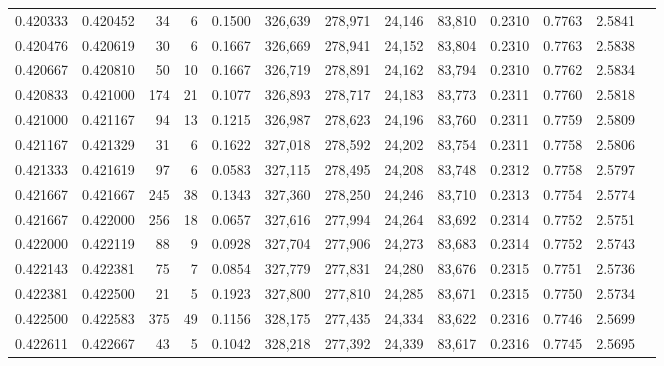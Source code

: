 \begin{tabular}{rrrrrrrrrrrrr}
0.420333 & 0.420452 &    34 &   6 &                                     0.1500 & 326,639 & 278,971 &  24,146 &  83,810 & 0.2310 & 0.7763 & 2.5841 \\
0.420476 & 0.420619 &    30 &   6 &                                     0.1667 & 326,669 & 278,941 &  24,152 &  83,804 & 0.2310 & 0.7763 & 2.5838 \\
0.420667 & 0.420810 &    50 &  10 &                                     0.1667 & 326,719 & 278,891 &  24,162 &  83,794 & 0.2310 & 0.7762 & 2.5834 \\
0.420833 & 0.421000 &   174 &  21 &                                     0.1077 & 326,893 & 278,717 &  24,183 &  83,773 & 0.2311 & 0.7760 & 2.5818 \\
0.421000 & 0.421167 &    94 &  13 &                                     0.1215 & 326,987 & 278,623 &  24,196 &  83,760 & 0.2311 & 0.7759 & 2.5809 \\
0.421167 & 0.421329 &    31 &   6 &                                     0.1622 & 327,018 & 278,592 &  24,202 &  83,754 & 0.2311 & 0.7758 & 2.5806 \\
0.421333 & 0.421619 &    97 &   6 &                                     0.0583 & 327,115 & 278,495 &  24,208 &  83,748 & 0.2312 & 0.7758 & 2.5797 \\
0.421667 & 0.421667 &   245 &  38 &                                     0.1343 & 327,360 & 278,250 &  24,246 &  83,710 & 0.2313 & 0.7754 & 2.5774 \\
0.421667 & 0.422000 &   256 &  18 &                                     0.0657 & 327,616 & 277,994 &  24,264 &  83,692 & 0.2314 & 0.7752 & 2.5751 \\
0.422000 & 0.422119 &    88 &   9 &                                     0.0928 & 327,704 & 277,906 &  24,273 &  83,683 & 0.2314 & 0.7752 & 2.5743 \\
0.422143 & 0.422381 &    75 &   7 &                                     0.0854 & 327,779 & 277,831 &  24,280 &  83,676 & 0.2315 & 0.7751 & 2.5736 \\
0.422381 & 0.422500 &    21 &   5 &                                     0.1923 & 327,800 & 277,810 &  24,285 &  83,671 & 0.2315 & 0.7750 & 2.5734 \\
0.422500 & 0.422583 &   375 &  49 &                                     0.1156 & 328,175 & 277,435 &  24,334 &  83,622 & 0.2316 & 0.7746 & 2.5699 \\
0.422611 & 0.422667 &    43 &   5 &                                     0.1042 & 328,218 & 277,392 &  24,339 &  83,617 & 0.2316 & 0.7745 & 2.5695 \\

\end{tabular}
